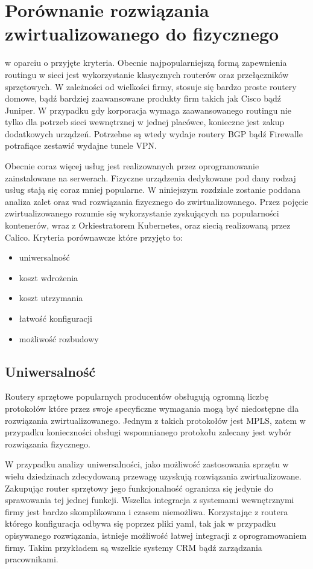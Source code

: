 \documentclass[pl,final,oneside]{mgr} %
\begin{document}
\chapter{Porównanie rozwiązania zwirtualizowanego do fizycznego} w oparciu o przyjęte kryteria.
Obecnie najpopularniejszą formą zapewnienia routingu w sieci jest wykorzystanie klasycznych routerów oraz przełączników sprzętowych. W zależności od wielkości firmy, stosuje się bardzo proste routery domowe, bądź bardziej zaawansowane produkty firm takich jak Cisco bądź Juniper. W przypadku gdy korporacja wymaga zaawansowanego routingu nie tylko dla potrzeb sieci wewnętrznej w jednej placówce, konieczne jest zakup dodatkowych urządzeń. Potrzebne są wtedy wydaje routery BGP bądź Firewalle potrafiące zestawić wydajne tunele VPN. 

Obecnie coraz więcej usług jest realizowanych przez oprogramowanie zainstalowane na serwerach. Fizyczne urządzenia dedykowane pod dany rodzaj usług stają się coraz mniej popularne. W niniejszym rozdziale zostanie poddana analiza zalet oraz wad rozwiązania fizycznego do zwirtualizowanego. Przez pojęcie zwirtualizowanego rozumie się wykorzystanie zyskujących na popularności kontenerów, wraz z Orkiestratorem Kubernetes, oraz siecią realizowaną przez Calico. Kryteria porównawcze które przyjęto to:
\begin{itemize}
	\item uniwersalność
	\item koszt wdrożenia
	\item koszt utrzymania
	\item łatwość konfiguracji
	\item możliwość rozbudowy
\end{itemize}

\section{Uniwersalność}
Routery sprzętowe popularnych producentów obsługują ogromną liczbę protokołów które przez swoje specyficzne wymagania mogą być niedostępne dla rozwiązania zwirtualizowanego. Jednym z takich protokołów jest MPLS, zatem w przypadku konieczności obsługi wspomnianego protokołu zalecany jest wybór rozwiązania fizycznego.

W przypadku analizy uniwersalności, jako możliwość zastosowania sprzętu w wielu dziedzinach zdecydowaną przewagę uzyskują rozwiązania zwirtualizowane. Zakupując router sprzętowy jego funkcjonalność ogranicza się jedynie do sprawowania tej jednej funkcji. Wszelka integracja z systemami wewnętrznymi firmy jest bardzo skomplikowana i czasem niemożliwa. Korzystając z routera którego konfiguracja odbywa się poprzez pliki yaml, tak jak w przypadku opisywanego rozwiązania, istnieje możliwość łatwej integracji z oprogramowaniem firmy. Takim przykładem są wszelkie systemy CRM bądź zarządzania pracownikami. 
\end{document}
